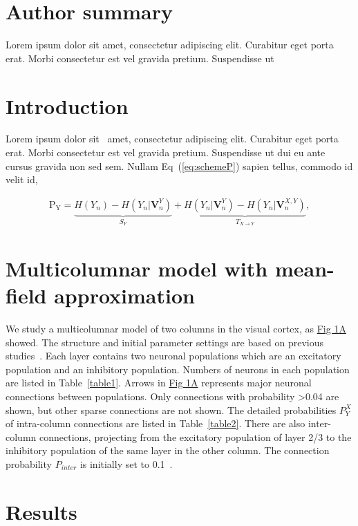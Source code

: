 \documentclass[10pt,letterpaper]{article}
\begin{document}
\section*{Author summary}
Lorem ipsum dolor sit amet, consectetur adipiscing elit. Curabitur eget porta erat. Morbi consectetur est vel gravida pretium. Suspendisse ut

\linenumbers

\section*{Introduction}
Lorem ipsum dolor sit~\cite{bib1} amet, consectetur adipiscing elit. Curabitur eget porta erat. Morbi consectetur est vel gravida pretium. Suspendisse ut dui eu ante cursus gravida non sed sem. Nullam Eq~(\ref{eq:schemeP}) sapien tellus, commodo id velit id,

\begin{eqnarray}
\label{eq:schemeP}
	\mathrm{P_Y} = \underbrace{H(Y_n) - H(Y_n|\mathbf{V}^{Y}_{n})}_{S_Y} + \underbrace{H(Y_n|\mathbf{V}^{Y}_{n})- H(Y_n|\mathbf{V}^{X,Y}_{n})}_{T_{X\rightarrow Y}},
\end{eqnarray}

\section*{Multicolumnar model with mean-field approximation}
We study a multicolumnar model of two columns in the visual cortex, as \hyperlink{fig:fig1}{Fig 1A} showed. The structure and initial parameter settings are based on previous studies~\cite{bib1}. Each layer contains two neuronal populations which are an excitatory population and an inhibitory population. Numbers of neurons in each population are listed in Table~\ref{table1}. Arrows in \hyperlink{fig:fig1}{Fig 1A} represents major neuronal connections between populations. Only connections with probability >0.04 are shown, but other sparse connections are not shown. The detailed probabilities $P_{Y}^{X}$ of intra-column connections are listed in Table~\ref{table2}. There are also inter-column connections, projecting from the excitatory population of layer 2/3 to the inhibitory population of the same layer in the other column. The connection probability $P_{inter}$ is initially set to 0.1~\cite{bib1}.


\section*{Results}
\end{document}
